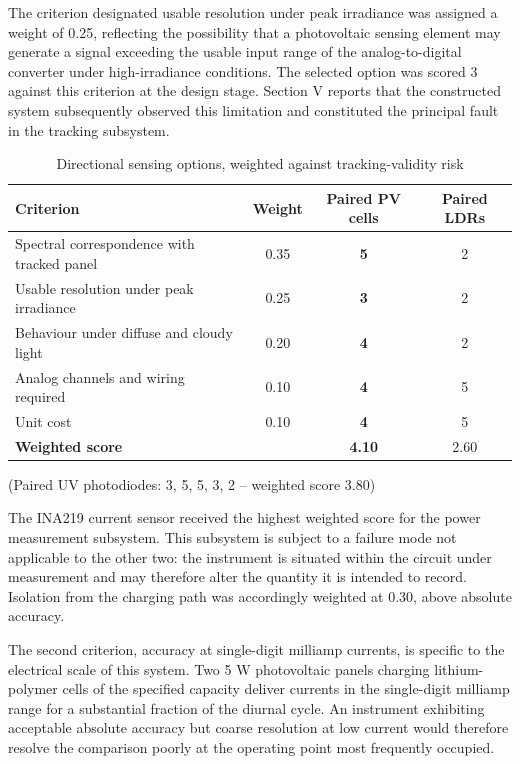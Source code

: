 \documentclass[journal]{IEEEtran}
\begin{document}
The criterion designated usable resolution under peak irradiance was assigned a weight
of 0.25, reflecting the possibility that a photovoltaic sensing element may generate a
signal exceeding the usable input range of the analog-to-digital converter under
high-irradiance conditions. The selected option was scored 3 against this criterion at
the design stage. Section V reports that the constructed system subsequently observed
this limitation and constituted the principal fault in the tracking subsystem.

\begin{table}[h]
\centering
\caption{Directional sensing options, weighted against tracking-validity risk}
\label{tab:sensing}
\small
\begin{tabular}{@{}p{2.7cm}ccc@{}}
\toprule
\textbf{Criterion} & \textbf{Weight} & \textbf{Paired PV cells} & \textbf{Paired LDRs} \\
\midrule
Spectral correspondence with tracked panel & 0.35 & \textbf{5} & 2 \\
Usable resolution under peak irradiance & 0.25 & \textbf{3} & 2 \\
Behaviour under diffuse and cloudy light & 0.20 & \textbf{4} & 2 \\
Analog channels and wiring required & 0.10 & \textbf{4} & 5 \\
Unit cost & 0.10 & \textbf{4} & 5 \\
\midrule
\textbf{Weighted score} & & \textbf{4.10} & 2.60 \\
\bottomrule
\end{tabular}

\vspace{2mm}
\small (Paired UV photodiodes: 3, 5, 5, 3, 2 -- weighted score 3.80)
\end{table}

The INA219 current sensor received the highest weighted score for the power
measurement subsystem. This subsystem is subject to a failure mode not applicable to
the other two: the instrument is situated within the circuit under measurement and may
therefore alter the quantity it is intended to record. Isolation from the charging path
was accordingly weighted at 0.30, above absolute accuracy.

The second criterion, accuracy at single-digit milliamp currents, is specific to the
electrical scale of this system. Two 5 W photovoltaic panels charging lithium-polymer
cells of the specified capacity deliver currents in the single-digit milliamp range for
a substantial fraction of the diurnal cycle. An instrument exhibiting acceptable
absolute accuracy but coarse resolution at low current would therefore resolve the
comparison poorly at the operating point most frequently occupied.
\end{document}
